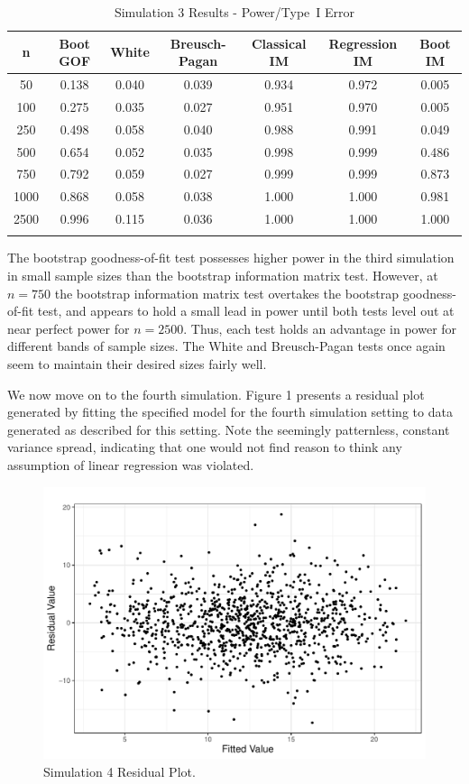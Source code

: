 \documentclass[sn-mathphys-ay]{sn-jnl}
\begin{document}
\begin{table}[h]
\caption{Simulation 3 Results - Power/Type~I Error}\label{sim3tab}%
\begin{tabular}{ c|c|c|c|c|c|c}
\toprule
n & Boot GOF & White & Breusch-Pagan & Classical IM & Regression IM & Boot IM \\
\midrule
50 & 0.138 & 0.040 & 0.039 & 0.934 & 0.972 & 0.005 \\
100 & 0.275 & 0.035 & 0.027 & 0.951 & 0.970 & 0.005 \\
250 & 0.498 & 0.058 & 0.040 & 0.988 & 0.991 & 0.049 \\
500 & 0.654 & 0.052 & 0.035 & 0.998 & 0.999 & 0.486 \\
750 & 0.792 & 0.059 & 0.027 & 0.999 & 0.999 & 0.873 \\
1000 & 0.868 & 0.058 & 0.038 & 1.000 & 1.000 & 0.981 \\
2500 & 0.996 & 0.115 & 0.036 & 1.000 & 1.000 & 1.000 \\
\botrule
\end{tabular}

\end{table}

The bootstrap goodness-of-fit test possesses higher power in the third simulation in small sample sizes than the bootstrap information matrix test. However, at $n = 750$ the bootstrap information matrix test
overtakes the bootstrap goodness-of-fit test, and appears to hold a small lead in power until both tests level out at near perfect power for $n = 2500$. Thus, each test holds an advantage in power for different bands of sample sizes.
The White and Breusch-Pagan tests once again seem to maintain their desired sizes fairly well.

We now move on to the fourth simulation. Figure 1 presents a residual plot generated by fitting the specified model for the fourth simulation setting to data generated as described for this setting.
Note the seemingly patternless, constant variance spread, indicating that one would not find reason to think any assumption of linear regression was violated. 

\begin{figure}[H]
\includegraphics[width=4.5in]{figures/sim3_residual_plot.pdf}\par
\caption{Simulation 4 Residual Plot.}
\centering
\end{figure}
\end{document}
